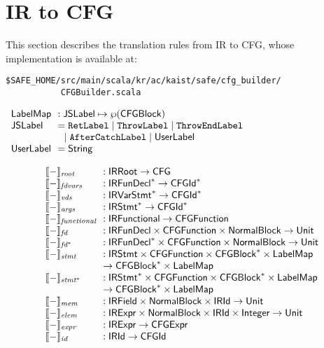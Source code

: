 \chapter{IR to CFG}
This section describes the \safe translation rules from IR to CFG,
whose implementation is available at:
\begin{verbatim}
$SAFE_HOME/src/main/scala/kr/ac/kaist/safe/cfg_builder/
           CFGBuilder.scala
\end{verbatim}

\noindent
$
\begin{array}{l@{~~}l}
\LabelMap &: \JSLabel \mapsto \powerset{\CFGBlock}\\
\JSLabel &= \RetLabel \mid \ThrowLabel \mid \ThrowEndLabel \\
& \ \ \mid \AfterCatchLabel \mid \UserLabel\\
\UserLabel &= \String\\
\end{array}
$

\[
\begin{array}{l@{~~}l}
\transfun{-}_{\emph{root}} &: \IRRoot \rightarrow \CFG \\
\transfun{-}_{\emph{fdvars}} &: \IRFunDecl^{*} \rightarrow \CFGId^{*} \\
\transfun{-}_{\emph{vds}} &: \IRVarStmt^{*} \rightarrow \CFGId^{*} \\
\transfun{-}_{\emph{args}} &: \IRStmt^{*} \rightarrow \CFGId^{*} \\
\transfun{-}_{\emph{functional}} &: \IRFunctional \rightarrow \CFGFunction \\
\transfun{-}_{\emph{fd}} &: \IRFunDecl \times \CFGFunction \times \NormalBlock \rightarrow \Unit \\
\transfun{-}_{\emph{fd}^{*}} &: \IRFunDecl^{*} \times \CFGFunction \times \NormalBlock \rightarrow \Unit \\
\transfun{-}_{\emph{stmt}} &: \IRStmt \times \CFGFunction \times \CFGBlock^{*} \times \LabelMap\\
& \rightarrow \CFGBlock^{*} \times \LabelMap\\
\transfun{-}_{\emph{stmt}^{*}} &: \IRStmt^{*} \times \CFGFunction \times \CFGBlock^{*} \times \LabelMap\\
& \rightarrow \CFGBlock^{*} \times \LabelMap\\
\transfun{-}_{\emph{mem}} &: \IRField \times \NormalBlock \times \IRId \rightarrow \Unit \\
\transfun{-}_{\emph{elem}} &: \IRExpr \times \NormalBlock \times \IRId \times \Integer \rightarrow \Unit \\
\transfun{-}_{\emph{expr}} &: \IRExpr \rightarrow \CFGExpr \\
\transfun{-}_{\emph{id}} &: \IRId \rightarrow \CFGId \\
\end{array}
\]

